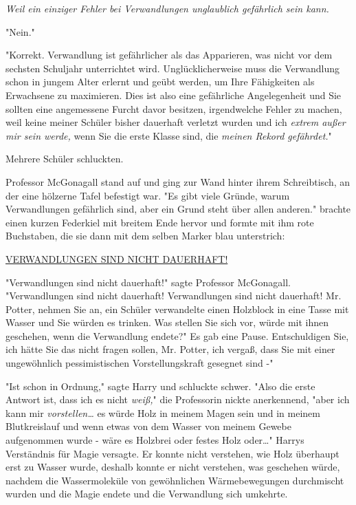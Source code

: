 {\emph{Weil ein einziger Fehler bei Verwandlungen unglaublich gefährlich sein kann.}

"Nein."

"Korrekt. Verwandlung ist gefährlicher als das Apparieren, was nicht vor dem sechsten Schuljahr unterrichtet wird. Unglücklicherweise muss die Verwandlung schon in jungem Alter erlernt und geübt werden, um Ihre Fähigkeiten als Erwachsene zu maximieren. Dies ist also eine gefährliche Angelegenheit und Sie sollten eine angemessene Furcht davor besitzen, irgendwelche Fehler zu machen, weil keine meiner Schüler bisher dauerhaft verletzt wurden und ich \emph{extrem außer mir sein werde,} wenn Sie die erste Klasse sind, die \emph{meinen Rekord gefährdet.}"

Mehrere Schüler schluckten.

Professor McGonagall stand auf und ging zur Wand hinter ihrem Schreibtisch, an der eine hölzerne Tafel befestigt war. "Es gibt viele Gründe, warum Verwandlungen gefährlich sind, aber ein Grund steht über allen anderen." brachte einen kurzen Federkiel mit breitem Ende hervor und formte mit ihm rote Buchstaben, die sie dann mit dem selben Marker blau unterstrich:

\uline{VERWANDLUNGEN SIND NICHT DAUERHAFT!}

"Verwandlungen sind nicht dauerhaft!" sagte Professor McGonagall. "Verwandlungen sind nicht dauerhaft! Verwandlungen sind nicht dauerhaft! Mr. Potter, nehmen Sie an, ein Schüler verwandelte einen Holzblock in eine Tasse mit Wasser und Sie würden es trinken. Was stellen Sie sich vor, würde mit ihnen geschehen, wenn die Verwandlung endete?" Es gab eine Pause. Entschuldigen Sie, ich hätte Sie das nicht fragen sollen, Mr. Potter, ich vergaß, dass Sie mit einer ungewöhnlich pessimistischen Vorstellungskraft gesegnet sind -"

"Ist schon in Ordnung," sagte Harry und schluckte schwer. "Also die erste Antwort ist, dass ich es nicht \emph{weiß,}" die Professorin nickte anerkennend, "aber ich kann mir \emph{vorstellen…} es würde Holz in meinem Magen sein und in meinem Blutkreislauf und wenn etwas von dem Wasser von meinem Gewebe aufgenommen wurde - wäre es Holzbrei oder festes Holz oder…" Harrys Verständnis für Magie versagte. Er konnte nicht verstehen, wie Holz überhaupt erst zu Wasser wurde, deshalb konnte er nicht verstehen, was geschehen würde, nachdem die Wassermoleküle von gewöhnlichen Wärmebewegungen durchmischt wurden und die Magie endete und die Verwandlung sich umkehrte.

}
